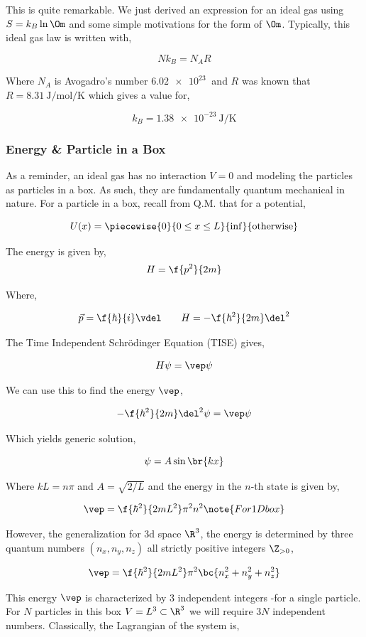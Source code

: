 \documentclass{article}
\begin{document}
This is quite remarkable. We just derived an expression for an ideal gas using $S = k_B\ln\Om$ and some simple motivations for the form of $\Om$. Typically, this ideal gas law is written with,

\[ N k_B = N_A R \]

Where $N_A$ is Avogadro's number $\SI{6.02e23}{}$ and $R$ was known that $R = \SI{8.31}{\J\per\mole\per\K}$ which gives a value for,

\[ k_B = \SI{1.38e-23}{\J\per\K} \]

\subsubsection{Energy \& Particle in a Box}

As a reminder, an ideal gas has no interaction $V=0$ and modeling the particles as particles in a box. As such, they are fundamentally quantum mechanical in nature. For a particle in a box, recall from Q.M. that for a potential,

\[ U(x) = \piecewise{0}{0 \leq x \leq L}{\inf}{\text{otherwise}} \]

The energy is given by,
\[ H = \f{p^2}{2m} \]

Where,

\[ \vec{p} = \f{\hbar}{i} \vdel \qquad H = -\f{\hbar^2}{2m}\del^2\]

The Time Independent Schrödinger Equation (TISE) gives,

\[ H \psi = \vep \psi \]

We can use this to find the energy $\vep$,

\[ -\f{\hbar^2}{2m}\del^2 \psi = \vep \psi \]

Which yields generic solution,

\[ \psi = A \sin \br{kx} \]

Where $k L = n \pi$ and $A = \sqrt{2/L}$ and the energy in the $n$-th state is given by,

\[ \vep = \f{\hbar^2}{2mL^2} \pi^2 n^2 \note{For 1D box}\]

However, the generalization for 3d space $\R^3$, the energy is determined by three quantum numbers $(n_x, n_y, n_z)$ all strictly positive integers $\Z_{>0}$,

\[ \vep = \f{\hbar^2}{2mL^2} \pi^2 \bc{n_x^2 + n_y^2 + n_z^2}\]

This energy $\vep$ is characterized by $3$ independent integers -for a single particle. For $N$ particles in this box $V = L^3 \subset \R^3$ we will require $3N$ independent numbers. Classically, the Lagrangian of the system is,
\end{document}
